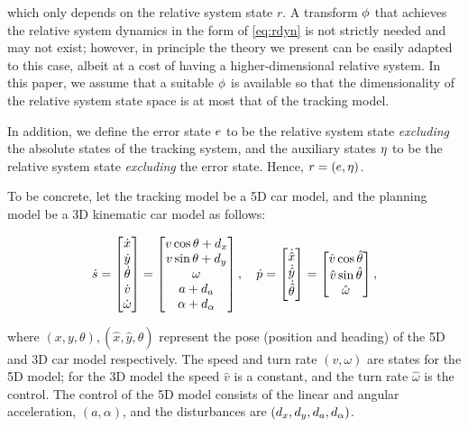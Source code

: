 \noindent which only depends on the relative system state $r$.
A transform $\phi$ that achieves the relative system dynamics in the form of \eqref{eq:rdyn} is not strictly needed and may not exist; however, in principle the theory we present can be easily adapted to this case, albeit at a cost of having a higher-dimensional relative system.
In this paper, we assume that a suitable $\phi$ is available so that the dimensionality of the relative system state space is at most that of the tracking model.

In addition, we define the error state $e$ to be the relative system state \textit{excluding} the absolute states of the tracking system, and the auxiliary states $\eta$ to be the relative system state \textit{excluding} the error state.
Hence, $r = (e, \eta)$.

To be concrete, let the tracking model be a 5D car model, and the planning model be a 3D kinematic car model as follows:

\begin{equation}
\label{eq:5D_and_3D_dyn}
\dot \tstate = 
\begin{bmatrix}
\dot x\\
\dot y\\
\dot\theta\\
\dot v\\
\dot \omega
\end{bmatrix} =
\begin{bmatrix}
v \cos \theta + \dstb_x\\
v \sin \theta + \dstb_y\\
\omega \\
a + \dstb_a\\
\alpha + \dstb_\alpha
\end{bmatrix}, \quad
\dot \pstate = 
\begin{bmatrix}
\dot {\hat x}\\
\dot {\hat y}\\
\dot {\hat \theta}
\end{bmatrix}
=
\begin{bmatrix}
\hat v \cos \hat\theta\\
\hat v \sin \hat\theta\\
\hat \omega
\end{bmatrix},
\end{equation}

\noindent where $(x,y,\theta),(\hat x, \hat y, \hat\theta)$ represent the pose (position and heading) of the 5D and 3D car model respectively.
The speed and turn rate $(v, \omega)$ are states for the 5D model; for the 3D model the speed $\hat v$ is a constant, and the turn rate $\hat \omega$ is the control.
The control of the 5D model consists of the linear and angular acceleration, $(a, \alpha)$, and the disturbances are $(d_x, d_y, d_a, d_\alpha)$.

